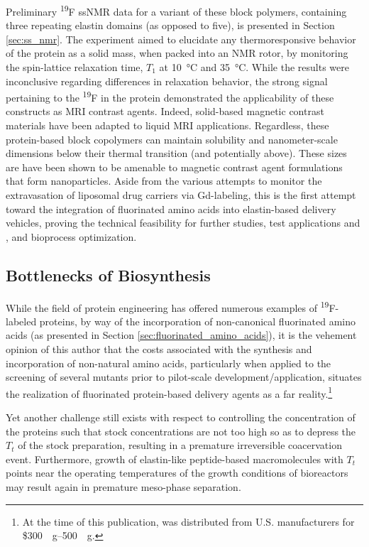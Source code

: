 \begin{refsection}
Preliminary \textsuperscript{19}F ssNMR data for a variant of these block
polymers, containing three repeating elastin domains (as opposed to five), is
presented in Section \ref{sec:ss_nmr}. The experiment aimed to elucidate any
thermoresponsive behavior of the protein as a solid mass, when packed into an
NMR rotor, by monitoring the spin-lattice relaxation time, ${T_{1}}$ at
\SI{10}{\celsius} and \SI{35}{\celsius}. While the results were inconclusive
regarding differences in relaxation behavior, the strong signal pertaining to
the \textsuperscript{19}F in the protein demonstrated the applicability of these
constructs as MRI contrast agents. Indeed, solid-based magnetic contrast
materials have been adapted to liquid MRI
applications.\cite{Garroway1999,Koptyug2007} Regardless, these protein-based
block copolymers can maintain solubility and nanometer-scale dimensions below
their thermal transition (and potentially above). These sizes are have been
shown to be amenable to magnetic contrast agent formulations that form
nanoparticles.\cite{Na2009} Aside from the various attempts to monitor the
extravasation of liposomal drug carriers via Gd-labeling,\cite{Tagami2011} this
is the first attempt toward the integration of fluorinated amino acids into
elastin-based delivery vehicles, proving the technical feasibility for further
studies, test applications  and , and bioprocess
optimization.

\subsection{Bottlenecks of Biosynthesis}

While the field of protein engineering has offered numerous examples of
\textsuperscript{19}F-labeled proteins, by way of the incorporation of
non-canonical fluorinated amino acids (as presented in Section
\ref{sec:fluorinated_amino_acids}), it is the vehement opinion of this author
that the costs associated with the synthesis and incorporation of non-natural
amino acids,\cite{Hodgson2004,Ojima1989} particularly when applied to the
screening of several mutants prior to pilot-scale development/application, 
situates the realization of fluorinated protein-based delivery agents as a far
reality.\footnote{At the time of this publication,  was
distributed from U.S. manufacturers for
\$\SIrange[range-phrase=--]{300}{500}{\per\gram}.}

Yet another challenge still exists with respect to controlling the concentration
of the proteins such that stock concentrations are not too high so as to depress
the ${T_t}$ of the stock preparation, resulting in a premature irreversible
coacervation event. Furthermore, growth of elastin-like peptide-based
macromolecules with ${T_t}$ points near the operating temperatures of the growth
conditions of bioreactors may result again in premature meso-phase separation.


\end{refsection}
